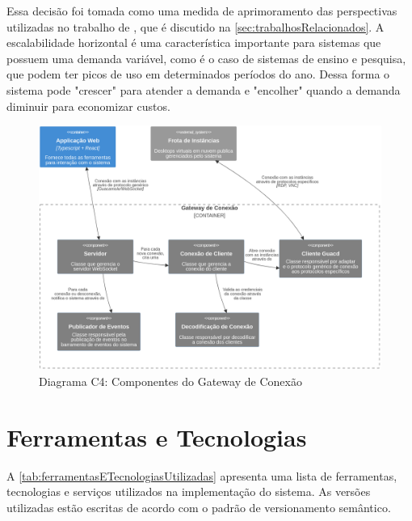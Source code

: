 Essa decisão foi tomada como uma medida de aprimoramento das perspectivas utilizadas no trabalho de \citet{edufirestick}, que é discutido na \autoref{sec:trabalhosRelacionados}. A escalabilidade horizontal é uma característica importante para sistemas que possuem uma demanda variável, como é o caso de sistemas de ensino e pesquisa, que podem ter picos de uso em determinados períodos do ano. Dessa forma o sistema pode "crescer" para atender a demanda e "encolher" quando a demanda diminuir para economizar custos.

\begin{figure}[H]
\caption{Diagrama C4: Componentes do Gateway de Conexão}
\label{fig:diagramaC4ComponentesDoGateway}
\includegraphics[width=\textwidth]{capitulos/2-metodologia/files/c4-component-connection-gateway.png}
\end{figure}

\section{Ferramentas e Tecnologias}
\label{sec:ferramentasETecnologias}

A \autoref{tab:ferramentasETecnologiasUtilizadas} apresenta uma lista de ferramentas, tecnologias e serviços utilizados na implementação do sistema. As versões utilizadas estão escritas de acordo com o padrão de versionamento semântico. \citep{semverdocs}

